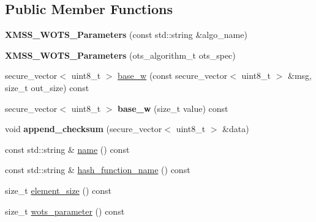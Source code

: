 \subsection*{Public Member Functions}
\begin{DoxyCompactItemize}
\item 
\mbox{\label{class_botan_1_1_x_m_s_s___w_o_t_s___parameters_a675efe5f9bd0e6aede345ed18072ac49}} 
{\bfseries X\+M\+S\+S\+\_\+\+W\+O\+T\+S\+\_\+\+Parameters} (const std\+::string \&algo\+\_\+name)
\item 
\mbox{\label{class_botan_1_1_x_m_s_s___w_o_t_s___parameters_ac47da0c4bf533e8ff641a347e1e6666c}} 
{\bfseries X\+M\+S\+S\+\_\+\+W\+O\+T\+S\+\_\+\+Parameters} (ots\+\_\+algorithm\+\_\+t ots\+\_\+spec)
\item 
secure\+\_\+vector$<$ uint8\+\_\+t $>$ \hyperlink{class_botan_1_1_x_m_s_s___w_o_t_s___parameters_a1c4baa29d0136109302bbe72639620ab}{base\+\_\+w} (const secure\+\_\+vector$<$ uint8\+\_\+t $>$ \&msg, size\+\_\+t out\+\_\+size) const
\item 
\mbox{\label{class_botan_1_1_x_m_s_s___w_o_t_s___parameters_a204f63ab1e48b35a3cec30aeeff0c586}} 
secure\+\_\+vector$<$ uint8\+\_\+t $>$ {\bfseries base\+\_\+w} (size\+\_\+t value) const
\item 
\mbox{\label{class_botan_1_1_x_m_s_s___w_o_t_s___parameters_a9857ccfc25d7d6e5222e471a5795e062}} 
void {\bfseries append\+\_\+checksum} (secure\+\_\+vector$<$ uint8\+\_\+t $>$ \&data)
\item 
const std\+::string \& \hyperlink{class_botan_1_1_x_m_s_s___w_o_t_s___parameters_a8ab4c1563ea45a0a612580f52b99ccd6}{name} () const
\item 
const std\+::string \& \hyperlink{class_botan_1_1_x_m_s_s___w_o_t_s___parameters_af21ced80c6176475b613ab966811e6aa}{hash\+\_\+function\+\_\+name} () const
\item 
size\+\_\+t \hyperlink{class_botan_1_1_x_m_s_s___w_o_t_s___parameters_a41865ec18f86aa5a995de1c452df2b65}{element\+\_\+size} () const
\item 
size\+\_\+t \hyperlink{class_botan_1_1_x_m_s_s___w_o_t_s___parameters_a1226fc756a477864962d5a0d1c88184b}{wots\+\_\+parameter} () const

\end{DoxyCompactItemize}
